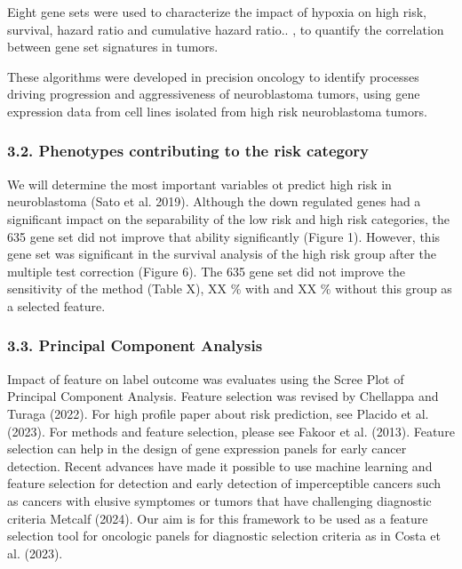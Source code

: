 \documentclass[
]{article}
\begin{document}
Eight gene sets were used to characterize the impact of hypoxia on high
risk, survival, hazard ratio and cumulative hazard ratio.. , to quantify
the correlation between gene set signatures in tumors.

These algorithms were developed in precision oncology to identify
processes driving progression and aggressiveness of neuroblastoma
tumors, using gene expression data from cell lines isolated from high
risk neuroblastoma tumors.

\hypertarget{phenotypes-contributing-to-the-risk-category}{%
\subsubsection{3.2. Phenotypes contributing to the risk
category}\label{phenotypes-contributing-to-the-risk-category}}

We will determine the most important variables ot predict high risk in
neuroblastoma (Sato et al. 2019). Although the down regulated genes had
a significant impact on the separability of the low risk and high risk
categories, the 635 gene set did not improve that ability significantly
(Figure 1). However, this gene set was significant in the survival
analysis of the high risk group after the multiple test correction
(Figure 6). The 635 gene set did not improve the sensitivity of the
method (Table X), XX \% with and XX \% without this group as a selected
feature.

\hypertarget{principal-component-analysis}{%
\subsubsection{3.3. Principal Component
Analysis}\label{principal-component-analysis}}

Impact of feature on label outcome was evaluates using the Scree Plot of
Principal Component Analysis. Feature selection was revised by Chellappa
and Turaga (2022). For high profile paper about risk prediction, see
Placido et al. (2023). For methods and feature selection, please see
Fakoor et al. (2013). Feature selection can help in the design of gene
expression panels for early cancer detection. Recent advances have made
it possible to use machine learning and feature selection for detection
and early detection of imperceptible cancers such as cancers with
elusive symptomes or tumors that have challenging diagnostic criteria
Metcalf (2024). Our aim is for this framework to be used as a feature
selection tool for oncologic panels for diagnostic selection criteria as
in Costa et al. (2023).
\end{document}
